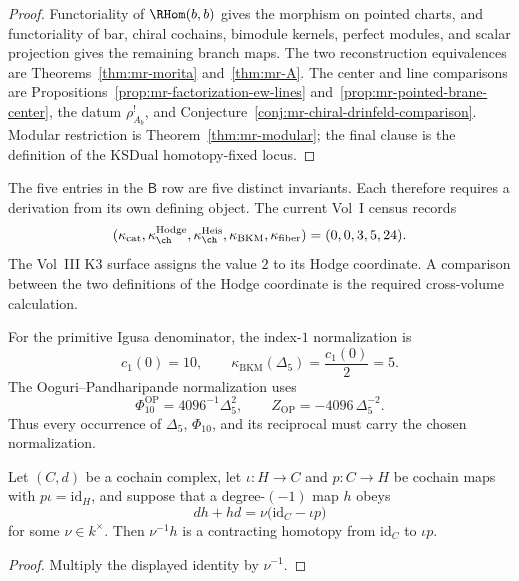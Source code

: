 \begin{proof}
Functoriality of $\RHom(b,b)$ gives the morphism on pointed charts,
and functoriality of bar, chiral cochains, bimodule kernels, perfect
modules, and scalar projection gives the remaining branch maps.
The two reconstruction equivalences are
Theorems~\ref{thm:mr-morita} and~\ref{thm:mr-A}.  The center and line
comparisons are Propositions~\ref{prop:mr-factorization-ew-lines}
and~\ref{prop:mr-pointed-brane-center}, the datum $\rho_{A_b}^!$, and
Conjecture~\ref{conj:mr-chiral-drinfeld-comparison}.  Modular
restriction is Theorem~\ref{thm:mr-modular}; the final clause is the
definition of the KSDual homotopy-fixed locus.
\end{proof}

\begin{remark}
\label{rem:mr-numerical}
The five entries in the $\mathsf B$ row are five distinct invariants.
Each therefore requires a derivation from its own defining object.  The
current Vol~I census records
\[
 (\kappa_{\mathrm{cat}},\kappa_{\ch}^{\mathrm{Hodge}},
 \kappa_{\ch}^{\mathrm{Heis}},\kappa_{\mathrm{BKM}},
 \kappa_{\mathrm{fiber}})=(0,0,3,5,24).
\]
The Vol~III K3 surface assigns the value $2$ to its Hodge coordinate.
A comparison between the two definitions of the Hodge coordinate is
the required cross-volume calculation.

For the primitive Igusa denominator, the index-$1$ normalization is
\[
 c_1(0)=10,
 \qquad
 \kappa_{\mathrm{BKM}}(\Delta_5)=\frac{c_1(0)}2=5.
\]
The Ooguri--Pandharipande normalization uses
\[
 \Phi_{10}^{\mathrm{OP}}=4096^{-1}\Delta_5^2,
 \qquad
 Z_{\mathrm{OP}}=-4096\,\Delta_5^{-2}.
\]
Thus every occurrence of $\Delta_5$, $\Phi_{10}$, and its reciprocal
must carry the chosen normalization.
\end{remark}

\begin{lemma}
\label{lem:mr-rescaling-contraction}
Let $(C,d)$ be a cochain complex, let
$\iota\colon H\to C$ and $p\colon C\to H$ be cochain maps with
$p\iota=\mathrm{id}_H$, and suppose that a degree-$(-1)$ map $h$ obeys
\[
 dh+hd=\nu\bigl(\mathrm{id}_C-\iota p\bigr)
\]
for some $\nu\in k^\times$.  Then $\nu^{-1}h$ is a contracting
homotopy from $\mathrm{id}_C$ to $\iota p$.
\end{lemma}

\begin{proof}
Multiply the displayed identity by $\nu^{-1}$.
\end{proof}

